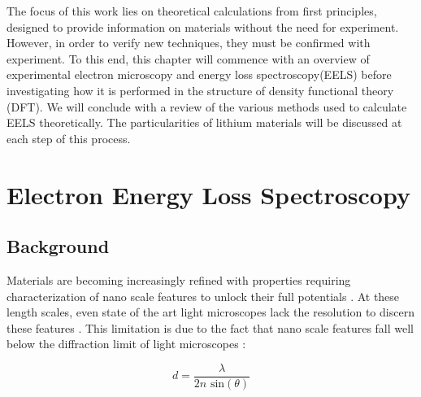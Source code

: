 


The focus of this work lies on theoretical calculations from first principles, designed to provide information on materials without the need for experiment.  However, in order to verify new techniques, they must be confirmed with experiment.  To this end, this chapter will commence with an overview of experimental electron microscopy and  energy loss spectroscopy(EELS) before investigating how it is performed in the  structure of density functional theory (DFT). We will conclude with a review of the various methods used to calculate EELS theoretically.  The particularities of lithium materials will be discussed at each step of this process.  
 
\section{Electron Energy Loss Spectroscopy}

\subsection{Background}
Materials are becoming increasingly refined with properties requiring characterization of nano scale features to unlock their full potentials \cite{goldstein_electron_2003}.  At these length scales, even state of the art light microscopes lack the resolution to discern these features \cite{rust_sub-diffraction-limit_2006}.  This limitation is due to the fact that nano scale features fall well below the diffraction limit of light microscopes \cite{hecht}: 

\begin{equation}
	d = \frac{\lambda}{2n\textrm{ sin}(\theta)}
\end{equation}

